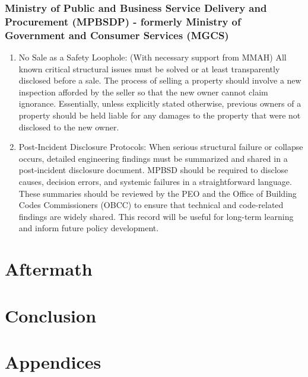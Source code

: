 \documentclass[12pt]{article}
\begin{document}
\subsubsection{Ministry of Public and Business Service Delivery and Procurement (MPBSDP) - formerly Ministry of Government and Consumer Services (MGCS)}
\begin{enumerate}
    \item No Sale as a Safety Loophole: (With necessary support from MMAH) All known critical structural issues must be solved or at least transparently disclosed before a sale. The process of selling a property should involve a new inspection afforded by the seller so that the new owner cannot claim ignorance. Essentially, unless explicitly stated otherwise, previous owners of a property should be held liable for any damages to the property that were not disclosed to the new owner.

    \item Post-Incident Disclosure Protocols: When serious structural failure or collapse occurs, detailed engineering findings must be summarized and shared in a post-incident disclosure document. MPBSD should be required to disclose causes, decision errors, and systemic failures in a straightforward language. These summaries should be reviewed by the PEO and the Office of Building Codes Commissioners (OBCC) to ensure that technical and code-related findings are widely shared. This record will be useful for long-term learning and inform future policy development.

\end{enumerate}




\section{Aftermath}

\section{Conclusion}


\section*{Appendices}

\newpage
\printbibliography
\end{document}
